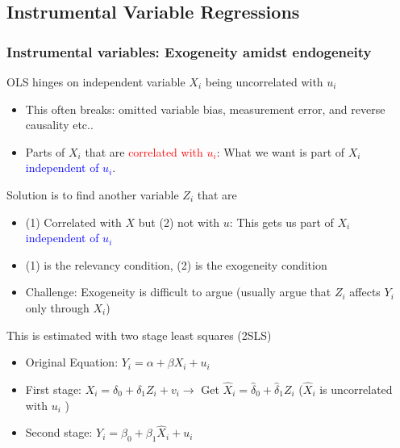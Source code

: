 \documentclass[aspectratio=169]{beamer}
\newenvironment{wideitemize}{\itemize\addtolength{\itemsep}{10pt}}{\enditemize}
\begin{document}
\subsection{Instrumental Variable Regressions}
\begin{frame}
\frametitle{Instrumental variables: Exogeneity amidst endogeneity} 
\begin{wideitemize}
\item OLS hinges on independent variable $X_i$ being uncorrelated with $u_i$
\begin{itemize}
\item This often breaks: omitted variable bias, measurement error, and reverse causality etc..
\item Parts of $X_i$ that are \textcolor{red}{correlated with $u_i$}: What we want is part of $X_i$ \textcolor{blue}{independent of $u_i$}.
\end{itemize}
\item Solution is to find another variable $Z_i$ that are
\begin{itemize}
\item (1) Correlated with $X$ but (2) not with $u$: This gets us part of $X_i$ \textcolor{blue}{independent of $u_i$}
\item (1) is the relevancy condition, (2) is the exogeneity condition
\item Challenge: Exogeneity is difficult to argue (usually argue that $Z_i$ affects $Y_i$ only through $X_i$)
\end{itemize}
\item This is estimated with two stage least squares (2SLS)
\begin{itemize}
\item Original Equation: $Y_i = \alpha + \beta X_i + u_i$
\item First stage: $X_i=\delta_0 + \delta_1Z_i+v_i \to$ Get $\widehat{X}_i=\hat{\delta}_0+\hat{\delta}_1Z_i$ ($\widehat{X}_i$ is uncorrelated with $u_i$ )
\item Second stage: $Y_i = \beta_0 + \beta_1 \widehat{X}_i + u_i$
\end{itemize}
\end{wideitemize}
\end{frame}
\end{document}
